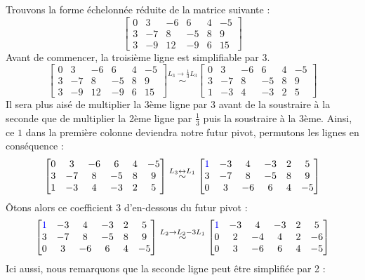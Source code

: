 \noindent Trouvons la forme échelonnée réduite de la matrice suivante :
$$
\begin{bmatrix}
 0 &  3 & -6 &  6 &  4 & -5\\
 3 & -7 &  8 & -5 &  8 &  9\\
 3 & -9 & 12 & -9 &  6 & 15
\end{bmatrix}
$$
Avant de commencer, la troisième ligne est simplifiable par 3.
$$
\begin{bmatrix}
 0 &  3 & -6 &  6 &  4 & -5\\
 3 & -7 &  8 & -5 &  8 &  9\\
 3 & -9 & 12 & -9 &  6 & 15
\end{bmatrix}
\overset{L_3 \to \frac{1}{3}L_3}{\sim}
\begin{bmatrix}
 0 &  3 & -6 &  6 &  4 & -5\\
 3 & -7 &  8 & -5 &  8 &  9\\
 1 & -3 &  4 & -3 &  2 & 5
\end{bmatrix}
$$
Il sera plus aisé de multiplier la 3ème ligne par 3 avant de la soustraire à la seconde que de multiplier la 2ème ligne par $\frac{1}{3}$ puis la soustraire à la 3ème. Ainsi, ce $1$ dans la première colonne deviendra notre futur pivot, permutons les lignes en conséquence :
$$
\begin{bmatrix}
 0 &  3 & -6 &  6 &  4 & -5\\
 3 & -7 &  8 & -5 &  8 &  9\\
 1 & -3 &  4 & -3 &  2 & 5
\end{bmatrix}
\overset{L_3 \leftrightarrow L_1}{\sim}
\begin{bmatrix}
 \color{blue}1 & -3 &  4 & -3 &  2 & 5\\
 3 & -7 &  8 & -5 &  8 &  9\\
 0 &  3 & -6 &  6 &  4 & -5
\end{bmatrix}
$$
Ôtons alors ce coefficient $3$ d'en-dessous du futur pivot :
$$
\begin{bmatrix}
 \color{blue}1 & -3 &  4 & -3 &  2 & 5\\
 3 & -7 &  8 & -5 &  8 &  9\\
 0 &  3 & -6 &  6 &  4 & -5
\end{bmatrix}
\overset{L_2 \to L_2 - 3L_1}{\sim}
\begin{bmatrix}
 \color{blue}1 & -3 &  4 & -3 &  2 & 5\\
 0 & 2 &  -4 & 4 &  2 &  -6\\
 0 &  3 & -6 &  6 &  4 & -5
\end{bmatrix}
$$
Ici aussi, nous remarquons que la seconde ligne peut être simplifiée par 2 :
